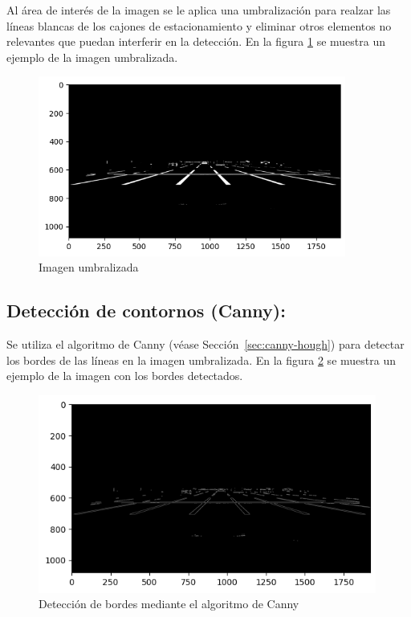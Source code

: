 Al área de interés de la imagen se le aplica una umbralización para realzar las líneas blancas de los cajones de estacionamiento
y eliminar otros elementos no relevantes que puedan interferir en la detección.
En la figura \ref{fig:threshold} se muestra un ejemplo de la imagen umbralizada.
\begin{figure}[!ht]
    \centering
    \includegraphics[width=0.9\textwidth]{img/reticule/thresholded}
    \caption{Imagen umbralizada}
    \label{fig:threshold}
\end{figure}

\subsection{Detección de contornos (Canny):}

Se utiliza el algoritmo de Canny \cite{canny1986edge} (véase Sección~\ref{sec:canny-hough}) para detectar los bordes de las líneas en la imagen umbralizada.
En la figura \ref{fig:edges} se muestra un ejemplo de la imagen con los bordes detectados.
\begin{figure}[!ht]
    \centering
    \includegraphics[width=0.99\textwidth]{img/reticule/canny}
    \caption{Detección de bordes mediante el algoritmo de Canny}
    \label{fig:edges}
\end{figure}

